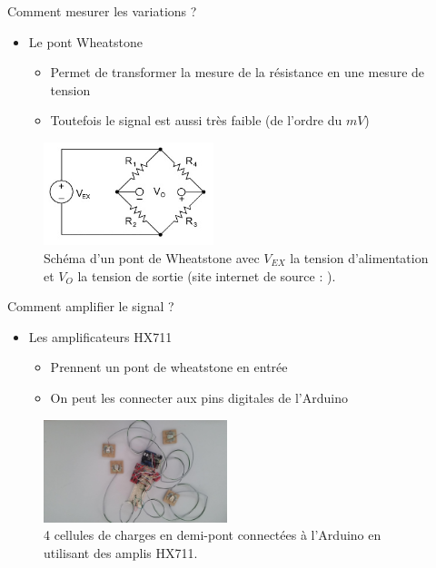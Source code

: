 \documentclass{beamer}
\begin{document}
\begin{frame}
\begin{block}{Comment mesurer les variations ?}
\pause
\begin{itemize}
\item Le pont Wheatstone
\pause
\begin{itemize}
\item Permet de transformer la mesure de la résistance en une mesure de tension
\pause
\item Toutefois le signal est aussi très faible (de l'ordre du $mV$)
\pause
\end{itemize}
\end{itemize}

\begin{figure}
\begin{center}
\includegraphics[height=3cm]{images/wheatstone_bridge.jpg}
\end{center}
\caption{Schéma d'un pont de Wheatstone avec $V_{EX}$ la tension d'alimentation et $V_O$ la tension de sortie (site internet de source : \cite{wheatstone}).}
\label{fig:wheatstone_bridge}
\end{figure}
\end{block}
\end{frame}

\begin{frame}
\begin{block}{Comment amplifier le signal ?}
\begin{itemize}
\item Les amplificateurs HX711
\pause
\begin{itemize}
\item Prennent un pont de wheatstone en entrée
\pause
\item On peut les connecter aux pins digitales de l'Arduino
\pause
\end{itemize}
\end{itemize}

\begin{figure}
\begin{center}
\includegraphics[height=3cm]{images/load_sensor_connected.jpg}
\end{center}
\caption{4 cellules de charges en demi-pont connectées à l'Arduino en utilisant des amplis HX711.}
\label{fig:load_sensor_connected}
\end{figure}
\end{block}
\end{frame}
\end{document}
